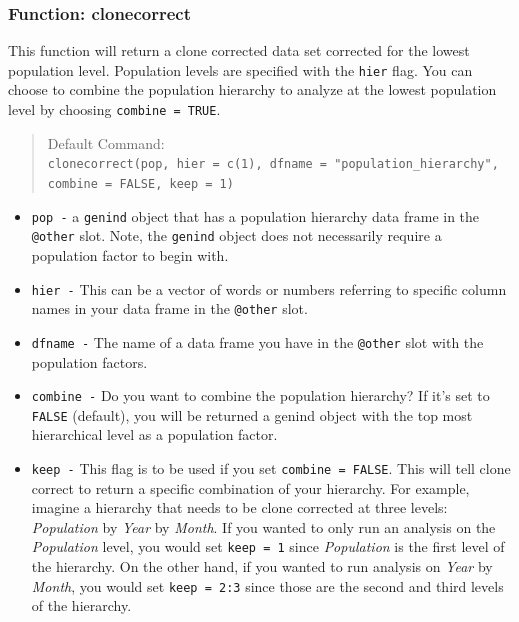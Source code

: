 \documentclass[letterpaper]{article}
\newcommand{\tab}{\hspace*{1em}}
\begin{document}
\subsubsection{Function: clonecorrect}\label{data.manip:cc:clonecorrect}

\tab\tab This function will return a clone corrected data set corrected for the lowest population level. Population levels are specified with the \texttt{hier} flag. You can choose to combine the population hierarchy to analyze at the lowest population level by choosing \texttt{combine = TRUE}.
\begin{quote}
Default Command:\\
\texttt{clonecorrect(pop, hier = c(1), dfname = "population\_hierarchy", combine = FALSE, keep = 1)}
\end{quote}
\begin{itemize}
  \item \texttt{pop -} a \texttt{genind} object that has a population hierarchy data frame in the \texttt{@other} slot. Note, the \texttt{genind} object does not necessarily require a population factor to begin with. 
  \item \texttt{hier -} This can be a vector of words or numbers referring to specific column names in your data frame in the \texttt{@other} slot.
  \item \texttt{dfname -} The name of a data frame you have in the \texttt{@other} slot with the population factors.
  \item \texttt{combine -} Do you want to combine the population hierarchy? If it's set to \texttt{FALSE} (default), you will be returned a genind object with the top most hierarchical level as a population factor. 
  \item \texttt{keep -} This flag is to be used if you set \texttt{combine = FALSE}. This will tell clone correct to return a specific combination of your hierarchy. For example, imagine a hierarchy that needs to be clone corrected at three levels: \textit{Population} by \textit{Year} by \textit{Month}. If you wanted to only run an analysis on the \textit{Population} level, you would set \texttt{keep = 1} since \textit{Population} is the first level of the hierarchy. On the other hand, if you wanted to run analysis on \textit{Year} by \textit{Month}, you would set \texttt{keep = 2:3} since those are the second and third levels of the hierarchy. 
\end{itemize}
\end{document}
